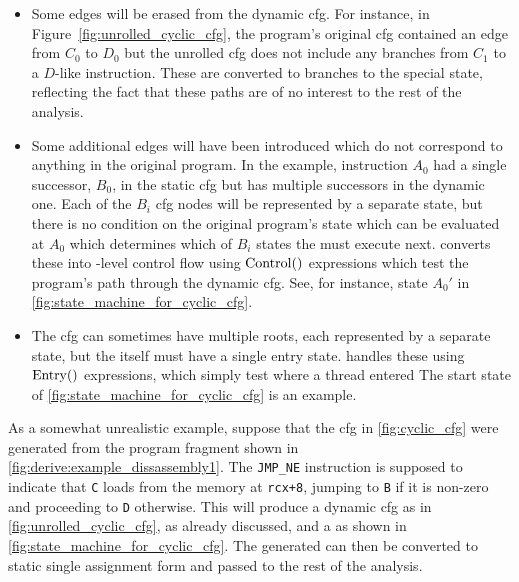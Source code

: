 \begin{itemize}
\item
  Some edges will be erased from the dynamic \gls{cfg}.  For instance,
  in Figure~\ref{fig:unrolled_cyclic_cfg}, the program's original
  \gls{cfg} contained an edge from $C_0$ to $D_0$ but the unrolled
  \gls{cfg} does not include any branches from $C_1$ to a $D$-like
  instruction.  These are converted to branches to the special
  {\stUnreached} state, reflecting the fact that these paths are of no
  interest to the rest of the analysis.
\item
  Some additional edges will have been introduced which do not
  correspond to anything in the original program.  In the example,
  instruction $A_0$ had a single successor, $B_0$, in the static
  \gls{cfg} but has multiple successors in the dynamic one.  Each of
  the $B_i$ \gls{cfg} nodes will be represented by a separate
  {\StateMachine} state, but there is no condition on the original
  program's state which can be evaluated at $A_0$ which determines
  which of $B_i$ states the {\StateMachine} must execute next.
  {\Technique} converts these into {\StateMachine}-level control flow
  using ${\mathrm{Control}}()$ expressions which test the program's
  path through the dynamic \gls{cfg}.  See, for instance, state $A_0'$
  in \autoref{fig:state_machine_for_cyclic_cfg}.
\item
  The \gls{cfg} can sometimes have multiple roots, each represented by
  a separate {\StateMachine} state, but the {\StateMachine} itself
  must have a single entry state.  {\Technique} handles these using
  $\mathrm{Entry}()$ expressions, which simply test where a thread entered
  The start state of \autoref{fig:state_machine_for_cyclic_cfg} is an
  example.
\end{itemize}
As a somewhat unrealistic example, suppose that the \gls{cfg} in
\autoref{fig:cyclic_cfg} were generated from the program fragment
shown in \autoref{fig:derive:example_dissassembly1}.  The
\verb|JMP_NE| instruction is supposed to indicate that \verb|C| loads
from the memory at \verb|rcx+8|, jumping to \verb|B| if it is non-zero
and proceeding to \verb|D| otherwise.  This will produce a dynamic
\gls{cfg} as in \autoref{fig:unrolled_cyclic_cfg}, as already
discussed, and a {\StateMachine} as shown in
\autoref{fig:state_machine_for_cyclic_cfg}.  The generated
        {\StateMachine} can then be converted to static single
        assignment\cite{cytron1991} form and passed to the rest of the
        analysis.

